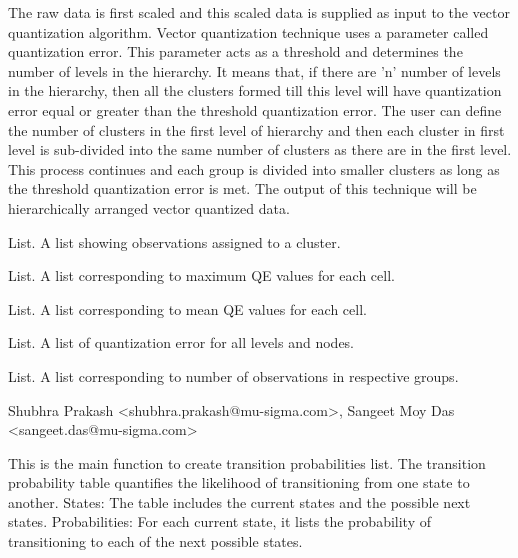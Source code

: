 \documentclass[letterpaper]{book}
\begin{document}
%
\begin{Details}
The raw data is first scaled and this scaled data is supplied as input to
the vector quantization algorithm. Vector quantization technique uses a
parameter called quantization error. This parameter acts as a threshold and
determines the number of levels in the hierarchy. It means that, if there
are 'n' number of levels in the hierarchy, then all the clusters formed till
this level will have quantization error equal or greater than the threshold
quantization error. The user can define the number of clusters in the first
level of hierarchy and then each cluster in first level is sub-divided into
the same number of clusters as there are in the first level. This process
continues and each group is divided into smaller clusters as long as the
threshold quantization error is met. The output of this technique will be
hierarchically arranged vector quantized data.
\end{Details}
%
\begin{Value}
\begin{ldescription}
\item[\code{values}]  List. A list showing observations assigned to a cluster.
\item[\code{maxQE}]  List. A list corresponding to maximum QE values for each cell. 
\item[\code{meanQE}]  List. A list corresponding to mean QE values for each cell. 
\item[\code{centers}]  List. A list of quantization error for all levels and nodes. 
\item[\code{nsize}]  List. A list corresponding to number of observations in respective groups. 
\end{ldescription}
\end{Value}
%
\begin{Author}
Shubhra Prakash <shubhra.prakash@mu-sigma.com>, Sangeet Moy Das <sangeet.das@mu-sigma.com>
\end{Author}
%
\begin{Description}
This is the main function to create transition probabilities list.
The transition probability table quantifies the likelihood of transitioning from one state to another. 
States: The table includes the current states and the possible next states.
Probabilities: For each current state, it lists the probability of transitioning to each of the next possible states.
\end{Description}
\end{document}
